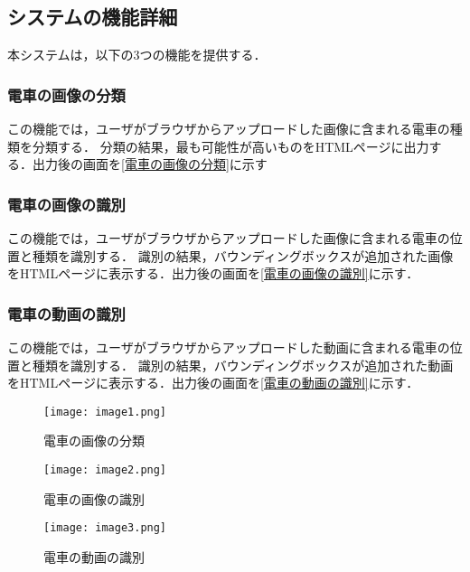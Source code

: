 \subsection{システムの機能詳細} 本システムは，以下の3つの機能を提供する．
\subsubsection{電車の画像の分類} この機能では，ユーザがブラウザからアップロードした画像に含まれる電車の種類を分類する． 分類の結果，最も可能性が高いものをHTMLページに出力する．出力後の画面を\ref{電車の画像の分類}に示す 
\subsubsection{電車の画像の識別} この機能では，ユーザがブラウザからアップロードした画像に含まれる電車の位置と種類を識別する．  識別の結果，バウンディングボックスが追加された画像をHTMLページに表示する．出力後の画面を\ref{電車の画像の識別}に示す．
\subsubsection{電車の動画の識別} この機能では，ユーザがブラウザからアップロードした動画に含まれる電車の位置と種類を識別する． 識別の結果，バウンディングボックスが追加された動画をHTMLページに表示する．出力後の画面を\ref{電車の動画の識別}に示す．

\begin{figure}[htbp]
  \centering
  \begin{minipage}[t]{0.3\\textwidth}
    \texttt{[image: image1.png]}
    \caption{電車の画像の分類}
  \end{minipage}
  \hfill
  \begin{minipage}[t]{0.3\\textwidth}
    \texttt{[image: image2.png]}
    \caption{電車の画像の識別}
  \end{minipage}
  \hfill
  \begin{minipage}[t]{0.3\\textwidth}
    \texttt{[image: image3.png]}
    \caption{電車の動画の識別}
  \end{minipage}
\end{figure}
